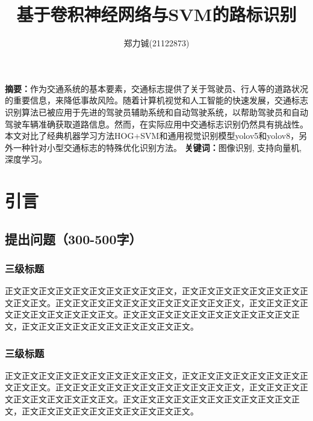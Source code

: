 \documentclass{article}
\title{\textbf{基于卷积神经网络与SVM的路标识别}}
\author{
郑力铖(21122873)
}
\begin{document}
 \songti


\date{}
\maketitle


\begin{center}
\setlength{\textwidth}{15cm}
\parbox{\textwidth}{
\textbf{摘要：}作为交通系统的基本要素，交通标志提供了关于驾驶员、行人等的道路状况的重要信息，来降低事故风险。随着计算机视觉和人工智能的快速发展，交通标志识别算法已被应用于先进的驾驶员辅助系统和自动驾驶系统，以帮助驾驶员和自动驾驶车辆准确获取道路信息。然而，在实际应用中交通标志识别仍然具有挑战性。本文对比了经典机器学习方法HOG+SVM和通用视觉识别模型yolov5和yolov8，另外一种针对小型交通标志的特殊优化识别方法。
\newline
  \textbf{关键词：}图像识别, 支持向量机, 深度学习。
}
\end{center}

\section{引言}
\subsection{提出问题（300-500字）}
\subsubsection{三级标题}
正文正文正文正文正文正文正文正文正文正文，正文正文正文正文正文正文正文正文正文正文。正文正文正文正文正文正文正文正文正文正文正文，正文正文正文正文正文正文正文正文正文正文。正文正文正文正文正文正文正文正文正文正文正文，正文正文正文正文正文正文正文正文正文正文。

\subsubsection{三级标题}
正文正文正文正文正文正文正文正文正文正文，正文正文正文正文正文正文正文正文正文正文。正文正文正文正文正文正文正文正文正文正文正文，正文正文正文正文正文正文正文正文正文正文。正文正文正文正文正文正文正文正文正文正文正文，正文正文正文正文正文正文正文正文正文正文。
\end{document}
